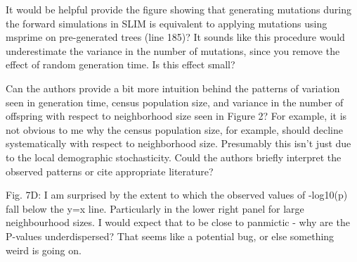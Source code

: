 \begin{point}{}
    It would be helpful provide the figure showing that generating mutations during the forward simulations in SLIM is equivalent to applying mutations using msprime on pre-generated trees (line 185)? It sounds like this procedure would underestimate the variance in the number of mutations, since you remove the effect of random generation time. Is this effect small?
\end{point}


\begin{point}{}
    Can the authors provide a bit more intuition behind the patterns of variation seen in generation time, census population size, and variance in the number of offspring with respect to neighborhood size seen in Figure 2? For example, it is not obvious to me why the census population size, for example, should decline systematically with respect to neighborhood size. Presumably this isn't just due to the local demographic stochasticity. Could the authors briefly interpret the observed patterns or cite appropriate literature?
\end{point}

\reply{
    
}

\begin{point}{}
    Fig. 7D: I am surprised by the extent to which the observed values of -log10(p) fall below the y=x line. Particularly in the lower right panel for large neighbourhood sizes. I would expect that to be close to panmictic - why are the P-values underdispersed? That seems like a potential bug, or else something weird is going on.
\end{point}


